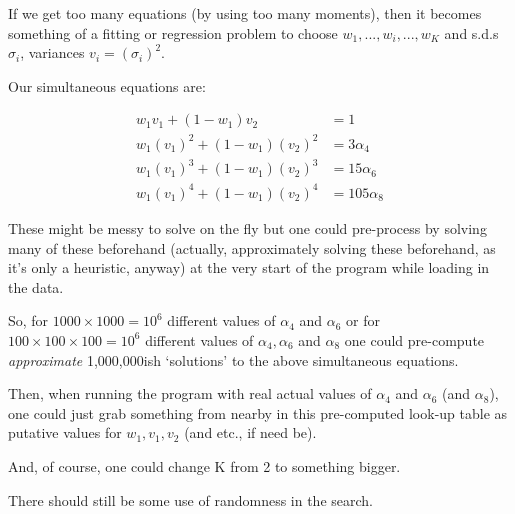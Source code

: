 \documentclass{elsarticle}
\begin{document}
If we get too many equations (by using too many moments), then it
becomes something of a fitting or regression problem to choose
$w_1, ..., w_i, ..., w_K$ and s.d.s $\sigma_i$, variances $v_i = (\sigma_i)^2$.

Our simultaneous equations are:

\begin{align*}
w_1 v_1       + (1 - w_1) v_2       &=    1\\
w_1 (v_1)^2  + (1 - w_1) (v_2)^2  &=    3 \alpha_4\\
w_1 (v_1)^3  + (1 - w_1) (v_2)^3  &=   15 \alpha_6\\
w_1 (v_1)^4  + (1 - w_1) (v_2)^4  &=  105 \alpha_8
\end{align*}

These might be messy to solve on the fly  but one could pre-process by solving many of these beforehand (actually, approximately solving these beforehand, as it's only
a heuristic, anyway) at the very start of the program while loading in the data.

So, for $1000 \times 1000 = 10^6$ different values of $\alpha_4$ and $\alpha_6$
or for $100 \times 100 \times 100 = 10^6$ different values of $\alpha_4, \alpha_6$ and $\alpha_8$
one could pre-compute {\em approximate} 1,000,000ish `solutions' to the above simultaneous equations.

Then, when running the program with real actual values of $\alpha_4$ and $\alpha_6$ (and $\alpha_8$),
one could just grab something from nearby in this pre-computed look-up table
as putative values for $w_1, v_1, v_2$ (and etc., if need be).

And, of course, one could change K from 2 to something bigger.

There should still be some use of randomness in the search.


\end{document}
